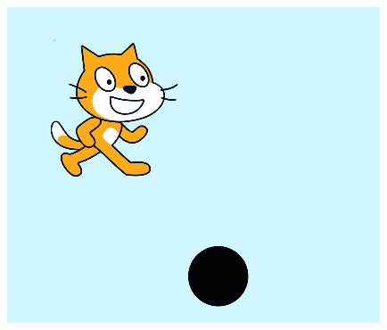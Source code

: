 \documentclass[10pt, a4paper]{article}
\begin{document}
\begin{enumerate}
        \begin{figure}[htbp]
            \centering
            \begin{minipage}[t]{.3\textwidth}
                \centering
                \begin{minipage}[t]{.5\textwidth}
                    \centering
                    \includegraphics[width=\textwidth]{figure/1-1.png}
                \end{minipage}
                \begin{minipage}[t]{.45\textwidth}
                    \centering

\end{minipage}
\end{minipage}
\end{figure}
\end{enumerate}
\end{document}
